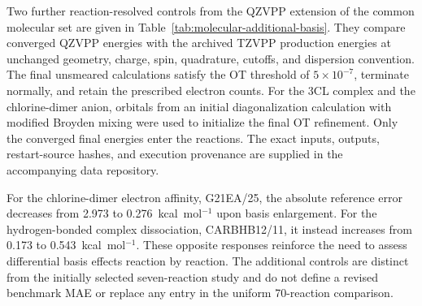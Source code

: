 Two further reaction-resolved controls from the QZVPP extension of the common molecular set are given in Table~\ref{tab:molecular-additional-basis}. They compare converged QZVPP energies with the archived TZVPP production energies at unchanged geometry, charge, spin, quadrature, cutoffs, and dispersion convention. The final unsmeared calculations satisfy the OT threshold of $5\times10^{-7}$, terminate normally, and retain the prescribed electron counts. For the 3CL complex and the chlorine-dimer anion, orbitals from an initial diagonalization calculation with modified Broyden mixing were used to initialize the final OT refinement. Only the converged final energies enter the reactions. The exact inputs, outputs, restart-source hashes, and execution provenance are supplied in the accompanying data repository.

For the chlorine-dimer electron affinity, G21EA/25, the absolute reference error decreases from 2.973 to 0.276~kcal~mol$^{-1}$ upon basis enlargement. For the hydrogen-bonded complex dissociation, CARBHB12/11, it instead increases from 0.173 to 0.543~kcal~mol$^{-1}$. These opposite responses reinforce the need to assess differential basis effects reaction by reaction. The additional controls are distinct from the initially selected seven-reaction study and do not define a revised benchmark MAE or replace any entry in the uniform 70-reaction comparison.


